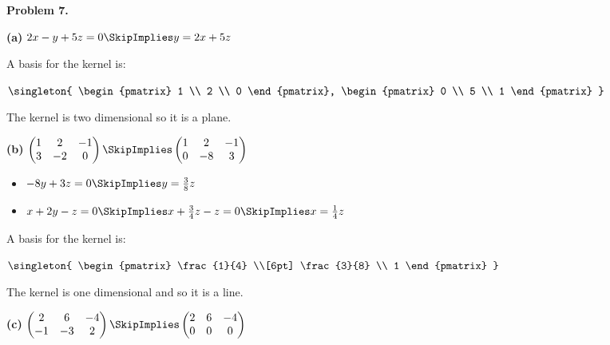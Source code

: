 \documentclass[oneside,12pt]{amsart}
\begin{document}
\bigskip

\textbf{Problem 7.}

\textbf{(a)}
$2x -y + 5z = 0 \SkipImplies y = 2x + 5z$

A basis for the kernel is:

$
\singleton{
\begin{pmatrix}
1 \\ 2 \\ 0
\end{pmatrix},
\begin{pmatrix}
0 \\ 5 \\ 1
\end{pmatrix}
}
$

The kernel is two dimensional so it is a plane.

\bigskip

\textbf{(b)}
\bigskip
$
\begin{pmatrix}
1 & 2 & -1 \\
3 & -2 & 0
\end{pmatrix}
\SkipImplies
\begin{pmatrix}
1 & 2 & -1 \\
0 & -8 & 3
\end{pmatrix}
$

\bigskip

\begin{itemize}
\item $-8y+3z = 0 \SkipImplies y = \frac{3}{8}z$
\item $x+2y -z = 0 \SkipImplies x + \frac{3}{4}z - z = 0 \SkipImplies x = \frac{1}{4}z$
\end{itemize}

A basis for the kernel is:

$
\singleton{
\begin{pmatrix}
\frac{1}{4} \\[6pt]
 \frac{3}{8}  \\
 1
\end{pmatrix}
}
$

\bigskip

The kernel is one dimensional and so it is a line.

\bigskip

\textbf{(c)}
\bigskip
$
\begin{pmatrix}
2 & 6 & -4 \\
-1 & -3 & 2
\end{pmatrix}
\SkipImplies
\begin{pmatrix}
2 & 6 & -4 \\
0 & 0 & 0
\end{pmatrix}
$
\end{document}

